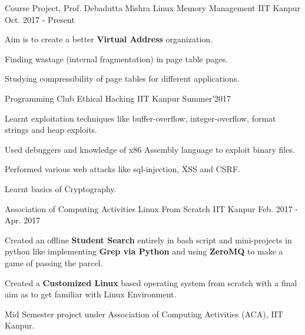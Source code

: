 

\begin{cventries}

  \cventry
    {Course Project, Prof. Debadutta Mishra} %
    {Linux Memory Management} %
    {IIT Kanpur} %
    {Oct. 2017 - Present} %
    {
      \begin{cvitems} %
        \item {Aim is to create a better \textbf{Virtual Address} organization.}
        \item {Finding wastage (internal fragmentation) in page table pages.} 
        \item {Studying compressibility of page tables for different applications.}
      \end{cvitems}
    }



  \cventry
    {Programming Club} %
    {Ethical Hacking} %
    {IIT Kanpur} %
    {Summer'2017} %
    {
      \begin{cvitems} %
        \item {Learnt exploitation techniques like buffer-overflow, integer-overflow, format strings and heap exploits.}
        \item {Used debuggers and knowledge of x86 Assembly language to exploit binary files.}
        \item {Performed various web attacks like sql-injection, XSS and CSRF.}
        \item {Learnt basics of Cryptography.}
      \end{cvitems}
    }



  \cventry
    {Association of Computing Activities} %
    {Linux From Scratch} %
    {IIT Kanpur} %
    {Feb. 2017 - Apr. 2017} %
    {
      \begin{cvitems} %
      \item {Created an offline \textbf{Student Search} entirely in bash script and mini-projects in python like implementing \textbf{Grep via Python} and using \textbf{ZeroMQ} to make a game of passing the parcel.}
        \item {Created a \textbf{Customized Linux} based operating system from scratch with a final aim as to get familiar with Linux Environment.}
        \item {Mid Semester project under Association of Computing Activities (ACA), IIT Kanpur.}
      \end{cvitems}
    }

\end{cventries}

